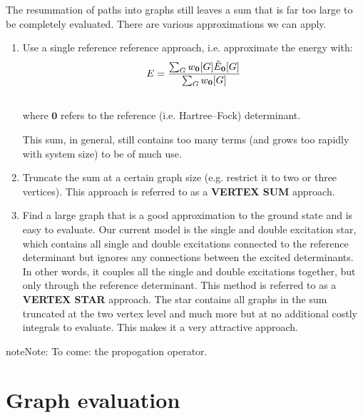 \documentclass[openany,a4paper,10pt,english]{manual}
\newcommand{\vecz}{\ensuremath{\mathbf{0}}}
\begin{document}
The resummation of paths into graphs still leaves a sum that is far too
large to be completely evaluated.  There are various approximations we
can apply.
\begin{enumerate}
\item {} 
Use a single reference reference approach, i.e. approximate the
energy with:
\begin{gather}
\begin{split}E = \frac{\sum_G w_{\vecz}[G] \tilde{E}_{\vecz}[G]}{\sum_G w_{\vecz}[G]}\end{split}\notag\\\begin{split}\end{split}\notag
\end{gather}
where $\vecz$ refers to the reference (i.e. Hartree--Fock)
determinant.

This sum, in general, still contains too many terms (and grows
too rapidly with system size) to be of much use.

\item {} 
Truncate the sum at a certain graph size (e.g. restrict it to
two or three vertices).  This approach is referred to as a
\textbf{VERTEX SUM} approach.

\item {} 
Find a large graph that is a good approximation to the ground state
and is easy to evaluate.  Our current model is the single and
double excitation star, which contains all single and double
excitations connected to the reference determinant but ignores any
connections between the excited determinants.  In other words,
it couples all the single and double excitations together,
but only through the reference determinant.  This method is
referred to as a \textbf{VERTEX STAR} approach.  The star contains all
graphs in the sum truncated at the two vertex level and much more but
at no additional costly integrals to evaluate.  This makes it a very
attractive approach.

\end{enumerate}

\begin{notice}{note}{Note:}
To come: the propogation operator.
\end{notice}

\resetcurrentobjects
\hypertarget{--doc-theory/graph_evaluation}{}

\hypertarget{theory-graph-evaluation}{}\section{Graph evaluation}
\end{document}
